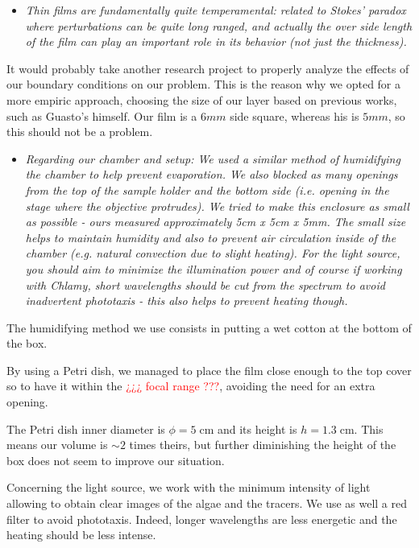 \begin{itemize}
	\item \textit{Thin films are fundamentally quite temperamental: related to Stokes' paradox where perturbations can be quite long ranged, and actually the over side length of the film can play an important role in its behavior (not just the thickness).}
\end{itemize}

It would probably take another research project to properly analyze the effects of our boundary conditions on our problem. This is the reason why we opted for a more empiric approach, choosing the size of our layer based on previous works, such as Guasto's himself. Our film is a $6mm$ side square, whereas his is $5mm$, so this should not be a problem.

\begin{itemize}
	\item \textit{Regarding our chamber and setup: We used a similar method of humidifying the chamber to help prevent evaporation. We also blocked as many openings from the top of the sample holder and the bottom side (i.e. opening in the stage where the objective protrudes). We tried to make this enclosure as small as possible - ours measured approximately 5cm x 5cm x 5mm. The small size helps to maintain humidity and also to prevent air circulation inside of the chamber (e.g. natural convection due to slight heating). For the light source, you should aim to minimize the illumination power and of course if working with Chlamy, short wavelengths should be cut from the spectrum to avoid inadvertent phototaxis - this also helps to prevent heating though.}
\end{itemize}

The humidifying method we use consists in putting a wet cotton at the bottom of the box. 

By using a Petri dish, we managed to place the film close enough to the top cover so to have it within the \textcolor{red}{¿¿¿ focal range ???}, avoiding the need for an extra opening. 

The Petri dish inner diameter is $\phi = 5 \; \textrm{cm}$ and its height is $h = 1.3 \; \textrm{cm}$. This means our volume is $\sim 2$ times theirs, but further diminishing the height of the box does not seem to improve our situation.

Concerning the light source, we work with the minimum intensity of light allowing to obtain clear images of the algae and the tracers. We use as well a red filter to avoid phototaxis. Indeed, longer wavelengths are less energetic and the heating should be less intense.

